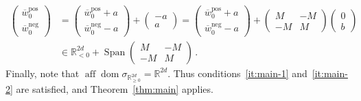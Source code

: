 \documentclass[11pt,english,reqno]{article}
\DeclareMathOperator{\Span}{Span}
\DeclareMathOperator{\dom}{dom}
\DeclareMathOperator{\aff}{aff}
\newcommand{\R}{\mathbb{R}}
\newcommand{\pos}{\text{pos}}
\renewcommand{\neg}{\text{neg}}
\renewcommand{\geq}{\geqslant}
\theoremstyle{plain}
\theoremstyle{definition}
\theoremstyle{remark}
\numberwithin{equation}{section}
\begin{document}
\begin{align*}
	\begin{pmatrix}\overline{w}_0^{\pos} \\ \overline{w}_0^{\neg}\end{pmatrix} &= \begin{pmatrix}\overline{w}_0^{\pos}+a \\ \overline{w}_0^{\neg}-a \end{pmatrix} + \begin{pmatrix}-a \\ a \end{pmatrix} = \begin{pmatrix}\overline{w}_0^{\pos}+a \\ \overline{w}_0^{\neg}-a\end{pmatrix} + \begin{pmatrix} M & -M \\ -M & M \end{pmatrix} \begin{pmatrix} 0 \\ b \end{pmatrix} \\
	&\in \R^{2d}_{<0} + \Span \begin{pmatrix} M & -M \\ -M & M \end{pmatrix} \, .
\end{align*}
Finally, note that $\aff \dom \sigma_{\R^{2d}_{\geq 0}} = \R^{2d}$. Thus conditions~\ref{it:main-1} and~\ref{it:main-2} are satisfied, and Theorem~\ref{thm:main} applies.
\end{document}

